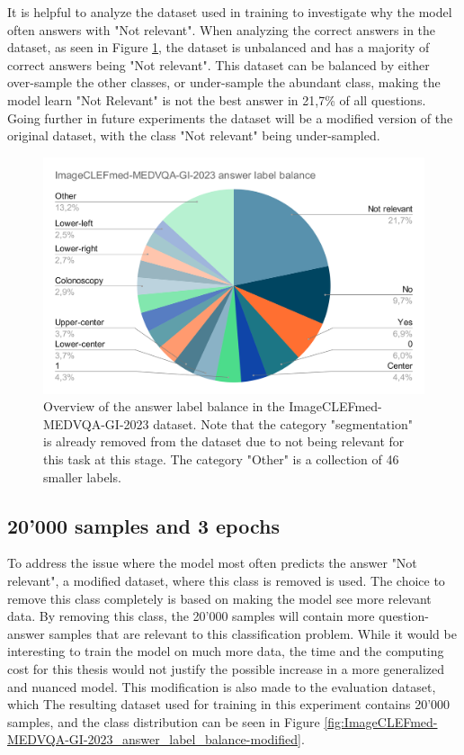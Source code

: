     It is helpful to analyze the dataset used in training to investigate why the model often answers with "Not relevant".
    When analyzing the correct answers in the dataset, as seen in Figure \ref{fig:ImageCLEFmed-MEDVQA-GI-2023_answer_label_balance}, the dataset is unbalanced and has a majority of correct answers being "Not relevant". This dataset can be balanced by either over-sample the other classes, or under-sample the abundant class, making the model learn "Not Relevant" is not the best answer in 21,7\% of all questions.
    Going further in future experiments the dataset will be a modified version of the original dataset, with the class "Not relevant" being under-sampled.
    
    


    \begin{figure}[htb]
        \centerline{
        \includegraphics[width=17cm]{images/ImageCLEFmed-MEDVQA-GI-2023_answer_label_balance.png}}
        \caption{Overview of the answer label balance in the ImageCLEFmed-MEDVQA-GI-2023 dataset. Note that the category "segmentation" is already removed from the dataset due to not being relevant for this task at this stage. The category "Other" is a collection of 46 smaller labels.}
        \label{fig:ImageCLEFmed-MEDVQA-GI-2023_answer_label_balance}
    \end{figure} 


    \subsection{20'000 samples and 3 epochs}

    To address the issue where the model most often predicts the answer "Not relevant", a modified dataset, where this class is removed is used. The choice to remove this class completely is based on making the model see more relevant data. By removing this class, the 20'000 samples will contain more question-answer samples that are relevant to this classification problem. While it would be interesting to train the model on much more data, the time and the computing cost for this thesis would not justify the possible increase in a more generalized and nuanced model. This modification is also made to the evaluation dataset, which The resulting dataset used for training in this experiment contains 20'000 samples, and the class distribution can be seen in Figure \ref{fig:ImageCLEFmed-MEDVQA-GI-2023_answer_label_balance-modified}.

